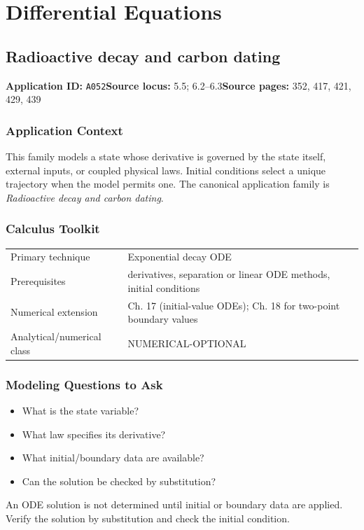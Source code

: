\documentclass[11pt]{book}
\newcommand{\pid}[1]{\texttt{#1}}
\begin{document}
\part{Differential Equations}
\chapter{Radioactive decay and carbon dating}\label{app:A052}
\textbf{Application ID:} \pid{A052}\quad \textbf{Source locus:} 5.5; 6.2–6.3\quad \textbf{Source pages:} 352, 417, 421, 429, 439
\section*{Application Context}
This family models a state whose derivative is governed by the state itself, external inputs, or coupled physical laws. Initial conditions select a unique trajectory when the model permits one. The canonical application family is \emph{Radioactive decay and carbon dating}.
\section*{Calculus Toolkit}
\begin{tabularx}{\textwidth}{@{}lX@{}}\toprule
Primary technique & Exponential decay ODE \\
Prerequisites & derivatives, separation or linear ODE methods, initial conditions \\
Numerical extension & Ch. 17 (initial-value ODEs); Ch. 18 for two-point boundary values \\
Analytical/numerical class & NUMERICAL-OPTIONAL \\
\bottomrule\end{tabularx}
\section*{Modeling Questions to Ask}\begin{itemize}
\item What is the state variable?
\item What law specifies its derivative?
\item What initial/boundary data are available?
\item Can the solution be checked by substitution?
\end{itemize}
\begin{errorbox}An ODE solution is not determined until initial or boundary data are applied. Verify the solution by substitution and check the initial condition.\end{errorbox}
\end{document}
